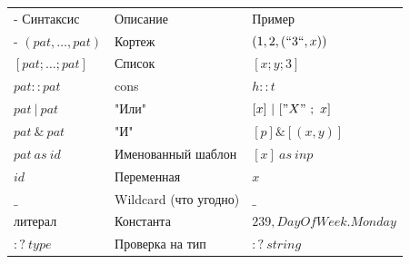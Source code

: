 \documentclass[a5paper]{article}
\begin{document}
\begin{tabu} {| X[0.9 l p] | X[1 l p] | X[1 l p] |}
	\tabucline-
	Синтаксис                               & Описание                  & Пример                  \\
	\tabucline-
	\everyrow{\tabucline-}
	$(pat, \ldots, pat)$                    & Кортеж                    & $(1, 2, (``3``, x))$    \\
	$[pat; \ldots; pat]$                    & Список                    & $[x; y; 3]$             \\
	$pat :: pat$                            & cons                      & $h :: t$                \\
	$pat\ |\ pat$                           & "Или"                     & $[x]\ |\ ["X"\ ;\ x]$ \\
	$pat\ \&\ pat$                          & "И"                       & $[p] \& [(x, y)]$       \\
	$pat\ as\ id$                           & Именованный шаблон        & $[x]\ as\ inp$          \\
	$id$                                    & Переменная                & $x$                     \\
	$\_$                                    & Wildcard (что угодно)     & $\_$                    \\
	литерал                                 & Константа                 & $239, DayOfWeek.Monday$ \\
	$:?\ type$                              & Проверка на тип           & $:?\ string$            \\
\end{tabu}
\end{document}
